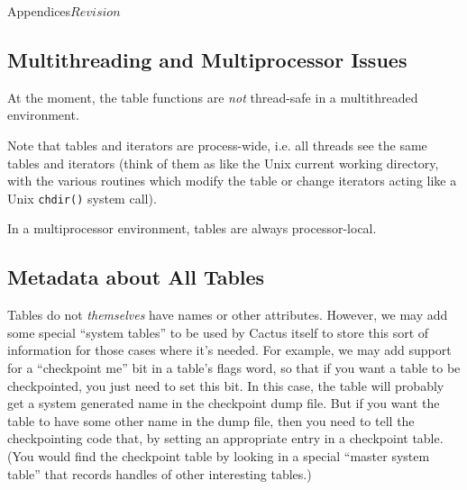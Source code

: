 \begin{cactuspart}{Appendices}{}{$Revision$}

\subsection{Multithreading and Multiprocessor Issues}

At the moment, the table functions are \emph{not} thread-safe
in a multithreaded environment. 

Note that tables and iterators are process-wide, i.e. all
threads see the same tables and iterators (think of them as like the
Unix current working directory, with the various routines which modify
the table or change iterators acting like a Unix \verb|chdir()| system
call).

In a multiprocessor environment, tables are always processor-local.


\subsection{Metadata about All Tables}

Tables do not \emph{themselves} have names or other
attributes.  However, we may add some special
``system tables'' to be used by Cactus itself to store this sort of
information for those cases where it's needed. For example, we may add support for a
``checkpoint me'' bit in a table's flags word, so that if you want a
table to be checkpointed, you just need to set this bit.
In this case, the table will probably get a system generated name in
the checkpoint dump file.  But if you want the table to have some
other name in the dump file, then you need to tell the checkpointing
code that, by setting an appropriate entry in a checkpoint table.
(You would find the checkpoint table by looking in a special
``master system table'' that records handles of other interesting tables.)


\end{cactuspart}
